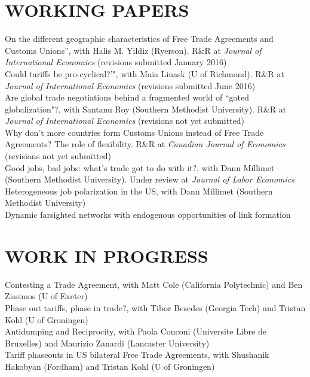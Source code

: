 \documentclass[11pt]{res}
\begin{document}
\begin{resume}
\section{WORKING PAPERS}\vspace{1.5mm}
{On the different geographic characteristics of Free Trade Agreements and Customs Unions''}, with Halis M. Yildiz (Ryerson). R\&R at \emph{Journal of International Economics} (revisions submitted January 2016) \vspace{1.5mm}\\
{Could tariffs be pro-cyclical?'"}, with Maia Linask (U of Richmond). R\&R at \emph{Journal of International Economics} (revisions submitted June 2016)\vspace{1.5mm}\\
{Are global trade negotiations behind a fragmented world of ``gated globalization"?}, with Santanu Roy (Southern Methodist University). R\&R at \emph{Journal of International Economics} (revisions not yet submitted)\vspace{1.5mm}\\
{Why don't more countries form Customs Unions instead of Free Trade Agreements? The role of flexibility}. R\&R at \emph{Canadian Journal of Economics} (revisions not yet submitted) \vspace{1.5mm}\\
{Good jobs, bad jobs: what's trade got to do with it?}, with Dann Millimet (Southern Methodist University). Under review at \emph{Journal of Labor Economics}\vspace{1.5mm}\\
{Heterogeneous job polarization in the US}, with Dann Millimet (Southern Methodist University)\vspace{1.5mm}\\
{Dynamic farsighted networks with endogenous opportunities of link formation} \vspace{1.5mm}\\

\section{WORK IN PROGRESS}\vspace{1.5mm}
Contesting a Trade Agreement, with Matt Cole (California Polytechnic) and Ben Zissimos (U of Exeter) \vspace{1.5mm}\\
Phase out tariffs, phase in trade?, with Tibor Besedes (Georgia Tech) and Tristan Kohl (U of Groningen) \vspace{1.5mm}\\
Antidumping and Reciprocity, with Paola Conconi (Universite Libre de Bruxelles) and Maurizio Zanardi (Lancaster University) \vspace{1.5mm}\\
Tariff phaseouts in US bilateral Free Trade Agreements, with Shushanik Hakobyan (Fordham) and Tristan Kohl (U of Groningen)\\


\end{resume}
\end{document}
